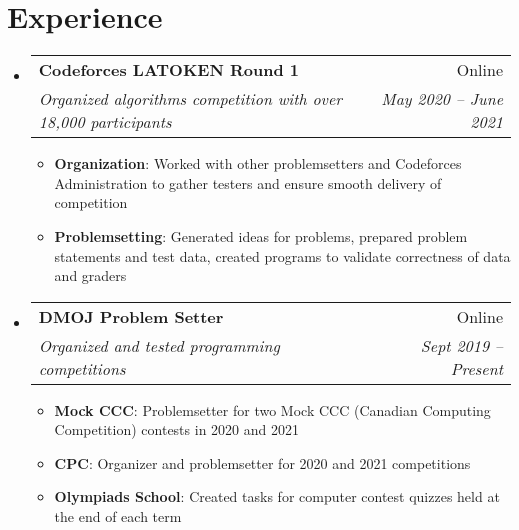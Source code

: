 \documentclass[letterpaper,11pt]{article}
\makeatletter
\newcommand{\resumeItem}[2]{
  \item\small{
    \textbf{#1}{: #2 \vspace{-2pt}}
  }
}
\newcommand{\resumeSubheading}[4]{
  \vspace{-1pt}\item
    \begin{tabular*}{0.97\textwidth}[t]{l@{\extracolsep{\fill}}r}
      \textbf{#1} & #2 \\
      \textit{\small#3} & \textit{\small #4} \\
    \end{tabular*}\vspace{-5pt}
}
\newcommand{\resumeSubHeadingListStart}{\begin{itemize}[leftmargin=*]}
\newcommand{\resumeSubHeadingListEnd}{\end{itemize}}
\newcommand{\resumeItemListStart}{\begin{itemize}}
\newcommand{\resumeItemListEnd}{\end{itemize}\vspace{-5pt}}
\makeatother
\begin{document}
\section{Experience}
  \resumeSubHeadingListStart
    \resumeSubheading
      {Codeforces LATOKEN Round 1}{Online}
      {Organized algorithms competition with over 18,000 participants}{May 2020 -- June 2021}
      \resumeItemListStart
        \resumeItem{Organization}
          {Worked with other problemsetters and Codeforces Administration to gather testers and ensure smooth delivery of competition}
        \resumeItem{Problemsetting}
          {Generated ideas for problems, prepared problem statements and test data, created programs to validate correctness of data and graders}
      \resumeItemListEnd
    
    \resumeSubheading
      {DMOJ Problem Setter}{Online}
      {Organized and tested programming competitions}{Sept 2019 -- Present}
      \resumeItemListStart
        \resumeItem{Mock CCC}
          {Problemsetter for two Mock CCC (Canadian Computing Competition) contests in 2020 and 2021}
        \resumeItem{CPC}
          {Organizer and problemsetter for 2020 and 2021 competitions}
        \resumeItem{Olympiads School}
          {Created tasks for computer contest quizzes held at the end of each term}
      \resumeItemListEnd
    

  \resumeSubHeadingListEnd

\end{document}
